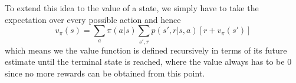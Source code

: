 \documentclass[11pt]{article}
\begin{document}
To extend this idea to the value of a state, we simply have to take the expectation over
every possible action and hence
\begin{equation}\label{eq:sv}
    v_\pi(s) = \sum\limits_{a}\pi(a|s) \sum\limits_{s', r} p(s', r | s, a) [r + v_\pi(s')]
\end{equation}
which means we the value function is defined recursively in terms of its future estimate until the
terminal state is reached, where the value always has to be 0 since no more rewards can be obtained
from this point.

%
%
\end{document}
